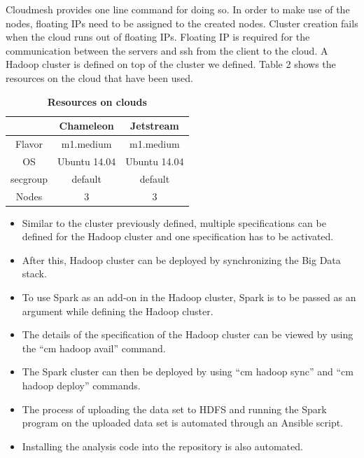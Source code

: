 \documentclass[9pt,twocolumn,twoside]{../../styles/osajnl}
\begin{document}
Cloudmesh provides one line command for doing so. In order to make use
of the nodes, floating IPs need to be assigned to the created
nodes. Cluster creation fails when the cloud runs out of floating
IPs. Floating IP is required for the communication between the servers
and ssh from the client to the cloud. A Hadoop cluster is defined on
top of the cluster we defined. Table 2 shows the resources on the
cloud that have been used.


\begin{table}[htbp]
\centering
\caption{\bf Resources on clouds}

 \begin{tabular}{|c | c | c|} 
 \hline
&  Chameleon & Jetstream \\ [0.5ex] 
 \hline\hline
    
Flavor &	m1.medium &	m1.medium \\
 \hline
OS&	Ubuntu 14.04 &	Ubuntu 14.04 \\ 
 \hline
secgroup &	default &	default \\ 
 \hline
Nodes &	3 &	3 \\ [1ex] 
 \hline

\end{tabular}
  \label{tab:fault-tolerance}
\end{table}

\begin{itemize}
  
\item Similar to the cluster previously defined, multiple
  specifications can be defined for the Hadoop cluster and one
  specification has to be activated.

\item After this, Hadoop cluster can be deployed by synchronizing the
  Big Data stack.

\item To use Spark as an add-on in the Hadoop cluster, Spark is to be
  passed as an argument while defining the Hadoop cluster.

\item The details of the specification of the Hadoop cluster can be
  viewed by using the “cm hadoop avail” command.

\item The Spark cluster can then be deployed by using “cm hadoop sync”
  and “cm hadoop deploy” commands.

\item The process of uploading the data set to HDFS and running the
  Spark program on the uploaded data set is automated through an
  Ansible script.

\item Installing the analysis code into the repository is also automated.
\end{itemize}
\end{document}
